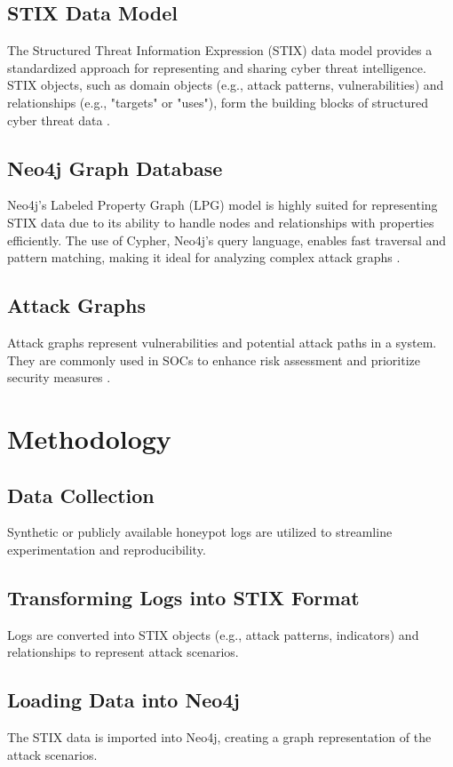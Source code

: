 \documentclass[conference]{IEEEtran}
\begin{document}
\subsection{STIX Data Model}
The Structured Threat Information Expression (STIX) data model provides a standardized approach for representing and sharing cyber threat intelligence. STIX objects, such as domain objects (e.g., attack patterns, vulnerabilities) and relationships (e.g., "targets" or "uses"), form the building blocks of structured cyber threat data \cite{simonnagy2022attackgraphs}.


\subsection{Neo4j Graph Database}
Neo4j's Labeled Property Graph (LPG) model is highly suited for representing STIX data due to its ability to handle nodes and relationships with properties efficiently. The use of Cypher, Neo4j’s query language, enables fast traversal and pattern matching, making it ideal for analyzing complex attack graphs \cite{simonnagy2022attackgraphs}.


\subsection{Attack Graphs}
Attack graphs represent vulnerabilities and potential attack paths in a system. They are commonly used in SOCs to enhance risk assessment and prioritize security measures \cite{attackgraphsurvey}.

\section{Methodology}
\subsection{Data Collection}
Synthetic or publicly available honeypot logs are utilized to streamline experimentation and reproducibility.

\subsection{Transforming Logs into STIX Format}
Logs are converted into STIX objects (e.g., attack patterns, indicators) and relationships to represent attack scenarios.

\subsection{Loading Data into Neo4j}
The STIX data is imported into Neo4j, creating a graph representation of the attack scenarios.
\end{document}
